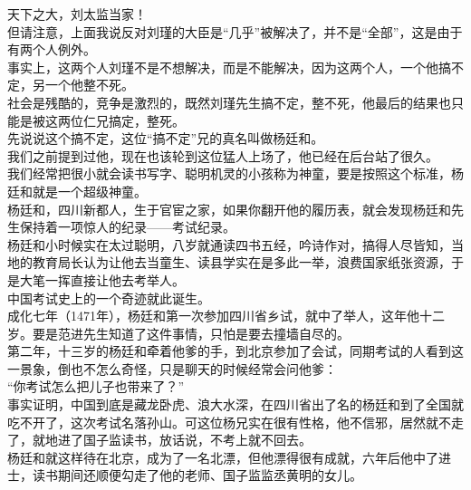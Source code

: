 \begin{multicols}{\theparacolNo}
天下之大，刘太监当家！\\

但请注意，上面我说反对刘瑾的大臣是“几乎”被解决了，并不是“全部”，这是由于有两个人例外。\\

事实上，这两个人刘瑾不是不想解决，而是不能解决，因为这两个人，一个他搞不定，另一个他整不死。\\

社会是残酷的，竞争是激烈的，既然刘瑾先生搞不定，整不死，他最后的结果也只能是被这两位仁兄搞定，整死。\\

先说说这个搞不定，这位“搞不定”兄的真名叫做杨廷和。\\

我们之前提到过他，现在也该轮到这位猛人上场了，他已经在后台站了很久。\\

我们经常把很小就会读书写字、聪明机灵的小孩称为神童，要是按照这个标准，杨廷和就是一个超级神童。\\

杨廷和，四川新都人，生于官宦之家，如果你翻开他的履历表，就会发现杨廷和先生保持着一项惊人的纪录——考试纪录。\\

杨廷和小时候实在太过聪明，八岁就通读四书五经，吟诗作对，搞得人尽皆知，当地的教育局长认为让他去当童生、读县学实在是多此一举，浪费国家纸张资源，于是大笔一挥直接让他去考举人。\\

中国考试史上的一个奇迹就此诞生。\\

成化七年（1471年），杨廷和第一次参加四川省乡试，就中了举人，这年他十二岁。要是范进先生知道了这件事情，只怕是要去撞墙自尽的。\\

第二年，十三岁的杨廷和牵着他爹的手，到北京参加了会试，同期考试的人看到这一景象，倒也不怎么奇怪，只是聊天的时候经常会问他爹：\\

“你考试怎么把儿子也带来了？”\\

事实证明，中国到底是藏龙卧虎、浪大水深，在四川省出了名的杨廷和到了全国就吃不开了，这次考试名落孙山。可这位杨兄实在很有性格，他不信邪，居然就不走了，就地进了国子监读书，放话说，不考上就不回去。\\

杨廷和就这样待在北京，成为了一名北漂，但他漂得很有成就，六年后他中了进士，读书期间还顺便勾走了他的老师、国子监监丞黄明的女儿。\\


\end{multicols}
